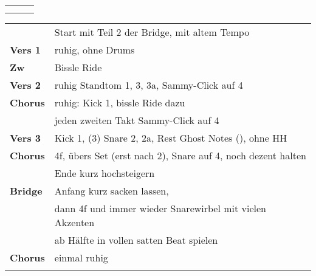 

\begin{tabular}{p{0.6cm}p{12cm}p{1.4cm}}
	\rowcolor{cyan} \myRow{\thesongnumber} & \myRow{Gotteslamm} & \myRow{70} \\
	                                       &                    &            \\
\end{tabular}

\begin{tabular}{p{1.6cm}l}
	                & Start mit Teil 2 der Bridge, mit altem Tempo                      \\
	\textbf{Vers 1} & ruhig, ohne Drums                                                 \\
	\textbf{Zw}     & Bissle Ride                                                       \\
	\textbf{Vers 2} & ruhig Standtom 1, 3, 3a, Sammy-Click auf 4                        \\
	\textbf{Chorus} & ruhig: Kick 1, bissle Ride dazu                                   \\
	                & jeden zweiten Takt Sammy-Click auf 4                              \\
	\textbf{Vers 3} & Kick 1, (3) Snare 2, 2a, Rest Ghost Notes (\sechzehntel), ohne HH \\
	\textbf{Chorus} & 4f, übers Set (erst nach 2), Snare auf 4, noch dezent halten      \\
	                & Ende kurz \achtel hochsteigern                                    \\
	\textbf{Bridge} & Anfang kurz sacken lassen,                                        \\ %
	                & dann 4f und immer wieder Snarewirbel mit vielen Akzenten          \\ %
	                & ab Hälfte in vollen satten Beat spielen                           \\ %
	\textbf{Chorus} & einmal ruhig                                                      \\ %
	                &                                                                   \\
\end{tabular}
